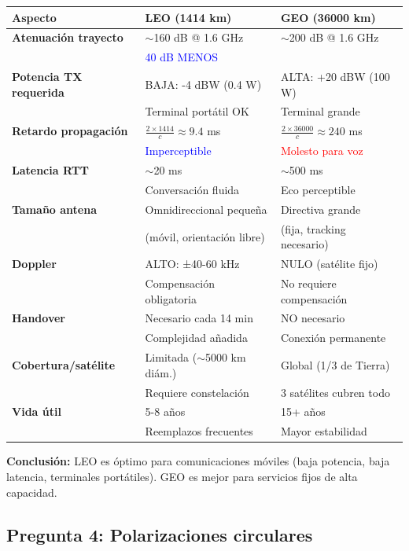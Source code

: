 \documentclass[a4paper,11pt]{article}
\begin{document}
\begin{center}
\begin{tabular}{|l|p{5cm}|p{5cm}|}
\hline
\textbf{Aspecto} & \textbf{LEO (1414 km)} & \textbf{GEO (36000 km)} \\
\hline
\textbf{Atenuación trayecto} & $\sim$160 dB @ 1.6 GHz & $\sim$200 dB @ 1.6 GHz \\
 & \textcolor{blue}{40 dB MENOS} & \\
\hline
\textbf{Potencia TX requerida} & BAJA: -4 dBW (0.4 W) & ALTA: +20 dBW (100 W) \\
 & Terminal portátil OK & Terminal grande \\
\hline
\textbf{Retardo propagación} & $\frac{2 \times 1414}{c} \approx 9.4$ ms & $\frac{2 \times 36000}{c} \approx 240$ ms \\
 & \textcolor{blue}{Imperceptible} & \textcolor{red}{Molesto para voz} \\
\hline
\textbf{Latencia RTT} & $\sim$20 ms & $\sim$500 ms \\
 & Conversación fluida & Eco perceptible \\
\hline
\textbf{Tamaño antena} & Omnidireccional pequeña & Directiva grande \\
 & (móvil, orientación libre) & (fija, tracking necesario) \\
\hline
\textbf{Doppler} & ALTO: ±40-60 kHz & NULO (satélite fijo) \\
 & Compensación obligatoria & No requiere compensación \\
\hline
\textbf{Handover} & Necesario cada 14 min & NO necesario \\
 & Complejidad añadida & Conexión permanente \\
\hline
\textbf{Cobertura/satélite} & Limitada ($\sim$5000 km diám.) & Global (1/3 de Tierra) \\
 & Requiere constelación & 3 satélites cubren todo \\
\hline
\textbf{Vida útil} & 5-8 años & 15+ años \\
 & Reemplazos frecuentes & Mayor estabilidad \\
\hline
\end{tabular}
\end{center}

\textbf{Conclusión:} LEO es óptimo para comunicaciones móviles (baja potencia, baja latencia, terminales portátiles). GEO es mejor para servicios fijos de alta capacidad.

\subsection*{Pregunta 4: Polarizaciones circulares}
\end{document}
